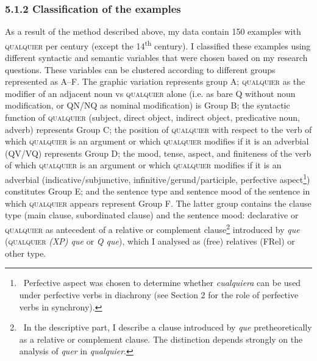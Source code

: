 \subsubsection[5.1.2 Classification of the examples]{\textbf{5.1.2 Classification of the examples}}
\begin{styleStandard}
As a result of the method described above, my data contain 150 examples with \textsc{qualquier} per century (except the 14\textsuperscript{th} century). I classified these examples using different syntactic and semantic variables that were chosen based on my research questions. These variables can be clustered according to different groups represented as A–F. The graphic variation represents group A; \textsc{qualquier} as the modifier of an adjacent noun vs \textsc{qualquier} alone (i.e. as bare Q without noun modification, or QN/NQ as nominal modification) is Group B; the syntactic function of \textsc{qualquier} (subject, direct object, indirect object, predicative noun, adverb) represents Group C; the position of \textsc{qualquier} with respect to the verb of which \textsc{qualquier} is an argument or which \textsc{qualquier} modifies if it is an adverbial (QV/VQ) represents Group D; the mood, tense, aspect, and finiteness of the verb of which \textsc{qualquier} is an argument or which \textsc{qualquier} modifies if it is an adverbial (indicative/subjunctive, infinitive/gerund/participle, perfective aspect\footnote{\textrm{\ Perfective aspect was chosen to determine whether }\textrm{\textit{cualquiera}}\textrm{ can be used under perfective verbs in diachrony (see Section 2 for the role of perfective verbs in synchrony).}}) constitutes Group E; and the sentence type and sentence mood of the sentence in which \textsc{qualquier} appears represent Group F. The latter group contains the clause type (main clause, subordinated clause) and the sentence mood: declarative or \textsc{qualquier} as antecedent of a relative or complement clause\footnote{\ \textrm{In the descriptive part, I describe a clause introduced by }\textrm{\textit{que}}\textrm{ pretheoretically as a relative or complement clause. The distinction depends strongly on the analysis of }\textrm{\textit{quer}}\textrm{ in }\textrm{\textit{qualquier}}\textrm{.}} introduced by \textit{que} (\textsc{qualquier}\textit{ (XP) que} or\textit{ Q que}), which I analysed as (free) relatives (FRel) or other type.
\end{styleStandard}


